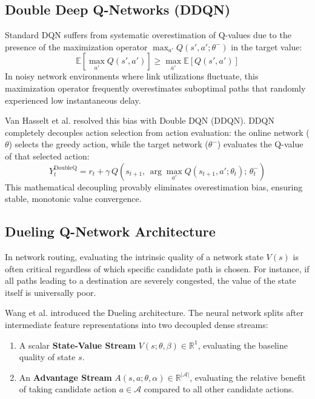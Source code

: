 \documentclass[12pt,a4paper,oneside]{report}
\begin{document}
\subsection{Double Deep Q-Networks (DDQN)}
Standard DQN suffers from systematic overestimation of Q-values due to the presence of the maximization operator $\max_{a'} Q(s', a'; \theta^-)$ in the target value:
\begin{equation}
    \mathbb{E}\left[ \max_{a'} Q(s', a') \right] \ge \max_{a'} \mathbb{E}\left[ Q(s', a') \right]
\end{equation}
In noisy network environments where link utilizations fluctuate, this maximization operator frequently overestimates suboptimal paths that randomly experienced low instantaneous delay.

Van Hasselt et al. \cite{vanhasselt2016deep} resolved this bias with Double DQN (DDQN). DDQN completely decouples action selection from action evaluation: the online network ($\theta$) selects the greedy action, while the target network ($\theta^-$) evaluates the Q-value of that selected action:
\begin{equation}
    Y_t^{\text{DoubleQ}} = r_t + \gamma \, Q\left(s_{t+1}, \, \arg\max_{a'} Q(s_{t+1}, a'; \theta_t); \, \theta_t^-\right)
    \label{eq:double_dqn_target}
\end{equation}
This mathematical decoupling provably eliminates overestimation bias, ensuring stable, monotonic value convergence.

\subsection{Dueling Q-Network Architecture}
In network routing, evaluating the intrinsic quality of a network state $V(s)$ is often critical regardless of which specific candidate path is chosen. For instance, if all paths leading to a destination are severely congested, the value of the state itself is universally poor.

Wang et al. \cite{wang2016dueling} introduced the Dueling architecture. The neural network splits after intermediate feature representations into two decoupled dense streams:
\begin{enumerate}
    \item A scalar \textbf{State-Value Stream} $V(s; \theta, \beta) \in \mathbb{R}^1$, evaluating the baseline quality of state $s$.
    \item An \textbf{Advantage Stream} $A(s, a; \theta, \alpha) \in \mathbb{R}^{|\mathcal{A}|}$, evaluating the relative benefit of taking candidate action $a \in \mathcal{A}$ compared to all other candidate actions.
\end{enumerate}
\end{document}
